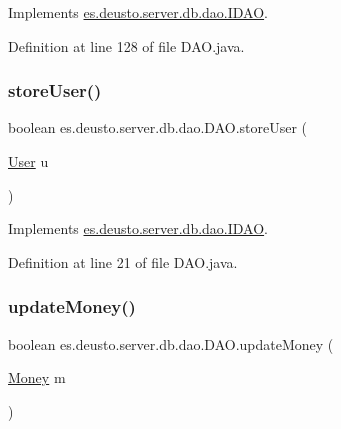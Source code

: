 Implements \hyperlink{interfacees_1_1deusto_1_1server_1_1db_1_1dao_1_1_i_d_a_o_a1f6d1e58c88fb3a24021f94de5e70056}{es.\+deusto.\+server.\+db.\+dao.\+I\+D\+AO}.



Definition at line 128 of file D\+A\+O.\+java.

\mbox{\label{classes_1_1deusto_1_1server_1_1db_1_1dao_1_1_d_a_o_acb146e96959c340ef828ef8e36b4283c}} 
\subsubsection{\texorpdfstring{store\+User()}{storeUser()}}
{\footnotesize\ttfamily boolean es.\+deusto.\+server.\+db.\+dao.\+D\+A\+O.\+store\+User (\begin{DoxyParamCaption}\item[{\hyperlink{classes_1_1deusto_1_1server_1_1db_1_1data_1_1_user}{User}}]{u }\end{DoxyParamCaption})}



Implements \hyperlink{interfacees_1_1deusto_1_1server_1_1db_1_1dao_1_1_i_d_a_o_ab943216560f43595a852b406dcd394a4}{es.\+deusto.\+server.\+db.\+dao.\+I\+D\+AO}.



Definition at line 21 of file D\+A\+O.\+java.

\mbox{\label{classes_1_1deusto_1_1server_1_1db_1_1dao_1_1_d_a_o_a05c7fc41d49e5ab7f0830405ccf60c87}} 
\subsubsection{\texorpdfstring{update\+Money()}{updateMoney()}}
{\footnotesize\ttfamily boolean es.\+deusto.\+server.\+db.\+dao.\+D\+A\+O.\+update\+Money (\begin{DoxyParamCaption}\item[{\hyperlink{classes_1_1deusto_1_1server_1_1db_1_1data_1_1_money}{Money}}]{m }\end{DoxyParamCaption})}



